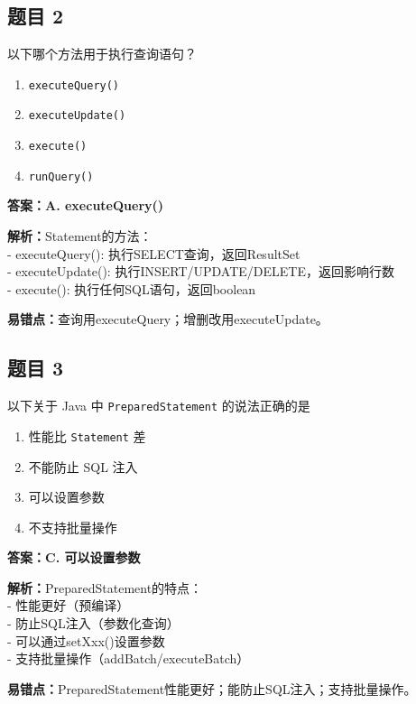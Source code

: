 \documentclass[12pt,a4paper]{ctexart}
\begin{document}
\subsection*{题目 2}
以下哪个方法用于执行查询语句？
\begin{enumerate}[label=\Alph*.]
	\item \texttt{executeQuery()}
	\item \texttt{executeUpdate()}
	\item \texttt{execute()}
	\item \texttt{runQuery()}
\end{enumerate}

\begin{answerbox}
	\textbf{答案：A. executeQuery()}

	\textbf{解析：}Statement的方法：\\
	- executeQuery(): 执行SELECT查询，返回ResultSet\\
	- executeUpdate(): 执行INSERT/UPDATE/DELETE，返回影响行数\\
	- execute(): 执行任何SQL语句，返回boolean

	\textbf{易错点：}查询用executeQuery；增删改用executeUpdate。
\end{answerbox}

\subsection*{题目 3}
以下关于 Java 中 \texttt{PreparedStatement} 的说法正确的是
\begin{enumerate}[label=\Alph*.]
	\item 性能比 \texttt{Statement} 差
	\item 不能防止 SQL 注入
	\item 可以设置参数
	\item 不支持批量操作
\end{enumerate}

\begin{answerbox}
	\textbf{答案：C. 可以设置参数}

	\textbf{解析：}PreparedStatement的特点：\\
	- 性能更好（预编译）\\
	- 防止SQL注入（参数化查询）\\
	- 可以通过setXxx()设置参数\\
	- 支持批量操作（addBatch/executeBatch）

	\textbf{易错点：}PreparedStatement性能更好；能防止SQL注入；支持批量操作。
\end{answerbox}
\end{document}
